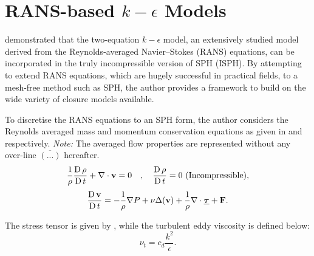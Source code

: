 \section[RANS-based k-epsilon Models]{RANS-based $k-\epsilon$ Models}
\label{sec:rans-based-k-epsilon-model}

\cite{Shao2006} demonstrated that the two-equation $k-\epsilon$ model, an extensively studied model derived from the Reynolds-averaged Navier–Stokes (RANS) equations, can be incorporated in the truly incompressible version of SPH (ISPH). By attempting to extend RANS equations, which are hugely successful in practical fields, to a mesh-free method such as SPH, the author provides a framework to build on the wide variety of closure models available.

To discretise the RANS equations to an SPH form, the author considers the Reynolds averaged mass and momentum conservation equations as given in  and  respectively. \textit{Note:} The averaged flow properties are represented without any over-line $\overline{(...)}$ hereafter.
\begin{equation}
    \frac{1}{\rho} \frac{\operatorname{D} \rho}{\operatorname{D} t} + \nabla \cdot \mathbf{v} = 0 \quad , \quad \frac{\operatorname{D} \rho}{\operatorname{D} t} = 0 \text{ (Incompressible)},
    \label{eq:Shao2006-rans-continuity-governing}
\end{equation}
\begin{equation}
    \frac{\operatorname{D} \mathbf{v}}{\operatorname{D} t} = -\frac{1}{\rho}\nabla P + \nu \Delta( \mathbf{v} ) + \frac{1}{\rho} \nabla \cdot \underline{\bm{\tau}} + \mathbf{F}.
    \label{eq:Shao2006-rans-mom-governing}
\end{equation}

The stress tensor is given by , while the turbulent eddy viscosity is defined below:
\begin{equation}
    \nu_t = c_d \frac{k^2}{\epsilon}.
    \label{eq:Shao2006-turbulent-eddy-visc}
\end{equation}

